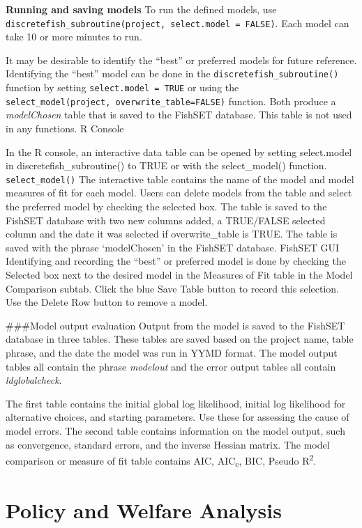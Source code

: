 \documentclass[
]{article}
\begin{document}
\textbf{Running and saving models}
To run the defined models, use \texttt{discretefish\_subroutine(project,\ select.model\ =\ FALSE)}. Each model can take 10 or more minutes to run.

It may be desirable to identify the ``best'' or preferred models for future reference. Identifying the ``best'' model can be done in the \texttt{discretefish\_subroutine()} function by setting \texttt{select.model\ =\ TRUE} or using the \texttt{select\_model(project,\ overwrite\_table=FALSE)} function. Both produce a \emph{modelChosen} table that is saved to the FishSET database. This table is not used in any functions.
R Console

In the R console, an interactive data table can be opened by setting select.model in discretefish\_subroutine() to TRUE or with the select\_model() function.
\texttt{select\_model()}
The interactive table contains the name of the model and model measures of fit for each model. Users can delete models from the table and select the preferred model by checking the selected box. The table is saved to the FishSET database with two new columns added, a TRUE/FALSE selected column and the date it was selected if overwrite\_table is TRUE. The table is saved with the phrase `modelChosen' in the FishSET database.
FishSET GUI
Identifying and recording the ``best'' or preferred model is done by checking the Selected box next to the desired model in the Measures of Fit table in the Model Comparison subtab. Click the blue Save Table button to record this selection. Use the Delete Row button to remove a model.

\#\#\#Model output evaluation
Output from the model is saved to the FishSET database in three tables. These tables are saved based on the project name, table phrase, and the date the model was run in YYMD format. The model output tables all contain the phrase \emph{modelout} and the error output tables all contain \emph{ldglobalcheck}.

The first table contains the initial global log likelihood, initial log likelihood for alternative choices, and starting parameters. Use these for assessing the cause of model errors. The second table contains information on the model output, such as convergence, standard errors, and the inverse Hessian matrix. The model comparison or measure of fit table contains AIC, AIC\textsubscript{c}, BIC, Pseudo R\textsuperscript{2}.

\hypertarget{policy-and-welfare-analysis}{%
\section{Policy and Welfare Analysis}\label{policy-and-welfare-analysis}}
\end{document}
